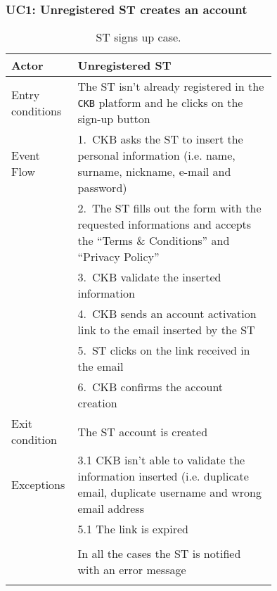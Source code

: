 \subsubsection*{UC1: Unregistered ST creates an account}
\begin{center}
  \begin{longtable}{l|p{0.75\linewidth}}
    \hline
    Actor & Unregistered ST \\
    \hline
    Entry conditions & The ST isn’t already registered in the \verb|CKB| platform and he clicks on the sign-up button \\
    \hline
    Event Flow & 1.\ CKB asks the ST to insert the personal information (i.e. name, surname, nickname, e-mail and password) \\
    & 2.\ The ST fills out the form with the requested informations and accepts the “Terms \& Conditions” and “Privacy Policy” \\
    & 3.\ CKB validate the inserted information \\
    & 4.\ CKB sends an account activation link to the email inserted by the ST \\
    & 5.\ ST clicks on the link received in the email \\
    & 6.\ CKB confirms the account creation  \\
    \hline
    Exit condition & The ST account is created \\
    \hline
    Exceptions & 3.1 CKB isn’t able to validate the information inserted (i.e. duplicate email, duplicate username and wrong email address \\
    & 5.1 The link is expired \\ \\
    & In all the cases the ST is notified with an error message\\
    \hline
    \caption{ST signs up case.}
    \label{tab: ST_signs_up}
  \end{longtable}
\end{center}

